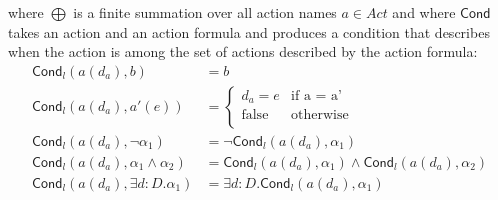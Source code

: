 \documentclass[letter]{llncs}
\newcommand{\TrA}{\ensuremath{\mathsf{Cond}}}
\begin{document}
where $\bigoplus$ is a finite summation over all action names
$a \in Act$ and
where $\TrA$ takes an action and an action formula and produces a condition
that describes when the action is among the set of actions described by
the action formula:
\[
\begin{array}{ll}
\TrA_l(a(d_a),b) & = b \\
\TrA_l(a(d_a),a'(e)) & = \left \{ \begin{array}{ll} d_a = e & \text{if a = a'}\\
                                  \text{false} & \text{otherwise}\\
                                  \end{array} \right .\\
\TrA_l(a(d_a),\neg \alpha_1) & = \neg \TrA_l(a(d_a),\alpha_1) \\
\TrA_l(a(d_a),\alpha_1 \wedge \alpha_2) & =
\TrA_l(a(d_a),\alpha_1) \wedge \TrA_l(a(d_a),\alpha_2) \\
\TrA_l(a(d_a),\exists d:D.\alpha_1) & = \exists d:D. \TrA_l(a(d_a),\alpha_1)
\end{array}
\]
\end{document}
